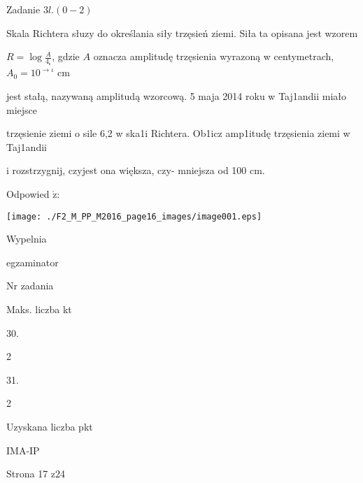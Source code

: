 \documentclass[a4paper,12pt]{article}
\begin{document}
Zadanie $3l. (0-2)$

Skala Richtera słuz$\mathrm{y}$ do określania siły trzęsień ziemi. Siła ta opisana jest wzorem

$R=\displaystyle \log\frac{A}{4_{\mathfrak{c}}}$, gdzie $A$ oznacza amplitudę trzęsienia wyrazoną w centymetrach, $A_{0}=10^{\rightarrow\iota}$ cm

jest stałą, nazywaną amplitudą wzorcową. 5 maja 2014 roku w Taj1andii miało miejsce

trzęsienie ziemi o sile 6,2 w ska1i Richtera. Ob1icz amp1itudę trzęsienia ziemi w Taj1andii

i rozstrzygnij, czyjest ona większa, czy- mniejsza od 100 cm.

Odpowied $\acute{\mathrm{z}}$:
\begin{center}
\texttt{[image: ./F2\_M\_PP\_M2016\_page16\_images/image001.eps]}
\end{center}
Wypelnia

egzaminator

Nr zadania

Maks. liczba kt

30.

2

31.

2

Uzyskana liczba pkt

IMA-IP

Strona 17 z24
\end{document}
